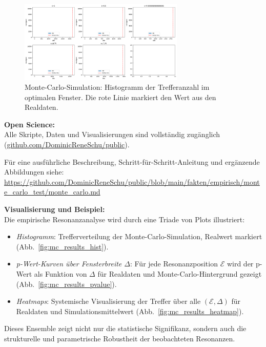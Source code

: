 \documentclass[12pt]{article}
\begin{document}
\begin{figure}[ht]
	\centering
	\includegraphics[width=0.7\textwidth]{figures/hist_mc_vs_real_hits.png}
	\caption{Monte-Carlo-Simulation: Histogramm der Trefferanzahl im optimalen Fenster. Die rote Linie markiert den Wert aus den Realdaten.}
	\label{fig:mc_results}
\end{figure}

\textbf{Open Science:}\\
Alle Skripte, Daten und Visualisierungen sind vollständig zugänglich (\href{https://github.com/DominicReneSchu/public/tree/main/fakten/empirisch/monte_carlo_test}{github.com/DominicReneSchu/public}).

\medskip

Für eine ausführliche Beschreibung, Schritt-für-Schritt-Anleitung und ergänzende Abbildungen siehe:\\
\url{https://github.com/DominicReneSchu/public/blob/main/fakten/empirisch/monte_carlo_test/monte_carlo.md}

\textbf{Visualisierung und Beispiel:}\\
Die empirische Resonanzanalyse wird durch eine Triade von Plots illustriert:
\begin{itemize}
	\item \textit{Histogramm}: Trefferverteilung der Monte-Carlo-Simulation, Realwert markiert (Abb.~\ref{fig:mc_results_hist}).
	\item \textit{p-Wert-Kurven über Fensterbreite $\Delta$}: Für jede Resonanzposition $\mathcal{E}$ wird der p-Wert als Funktion von $\Delta$ für Realdaten und Monte-Carlo-Hintergrund gezeigt (Abb.~\ref{fig:mc_results_pvalue}).
	\item \textit{Heatmaps}: Systemische Visualisierung der Treffer über alle $(\mathcal{E}, \Delta)$ für Realdaten und Simulationsmittelwert (Abb.~\ref{fig:mc_results_heatmap}).
\end{itemize}
Dieses Ensemble zeigt nicht nur die statistische Signifikanz, sondern auch die strukturelle und parametrische Robustheit der beobachteten Resonanzen.
\end{document}
